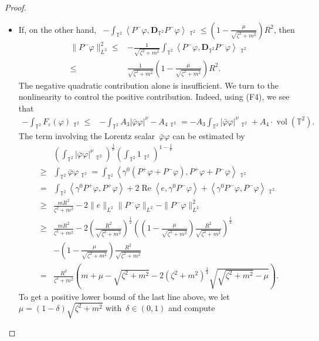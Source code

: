 \documentclass[11pt,final]{amsart}
\newcommand{\T}{\mathbb{T}}
\newcommand{\dd}{\mathop{}\!\mathrm{d}}
\newcommand{\eps}{\varepsilon}
\newcommand{\pD}{\mathbf{D}}
\newcommand{\Abracket}[1]{\left<#1\right>} %
\newcommand{\parenthesis}[1]{\left(#1\right)} %
\DeclareMathOperator{\dv}{\dd{vol}}
\DeclareMathOperator{\vol}{vol}
\begin{document}
\begin{proof}
\begin{itemize}
    \item If, on the other hand, ~$-\int_{\T^2}\Abracket{P^-\varphi,\pD_{\T^2} P^-\varphi}\dv_{\T^2}\leq(1-\frac{\mu}{\sqrt{\zeta^2+m^2}})R^2$, then 
    \begin{align}
    \|P^-\varphi\|_{L^2}^2
    \leq& -\frac{1}{\sqrt{\zeta^2+m^2}} \int_{\T^2} \Abracket{P^-\varphi,\pD_{\T^2} P^-\varphi }\dv_{\T^2} \\
    \leq& \frac{1}{\sqrt{\zeta^2+m^2}}(1-\frac{\mu}{\sqrt{\zeta^2+m^2}})R^2.
    \end{align}
    The negative quadratic contribution alone is insufficient.
    We turn to the nonlinearity to control the positive contribution.
    Indeed, using (F4), we see that
    \begin{align}
    -\int_{\T^2} F_\eps(\varphi)\dv_{\T^2}
    \leq& -\int_{\T^2} A_3 |\bar{\varphi}\varphi|^\nu -A_4 \dv_{\T^2}
    =-A_3\int_{\T^2} |\bar{\varphi}\varphi|^\nu\dv_{\T^2} + A_4 \cdot\vol(\T^2).
    \end{align}
    The term involving the Lorentz scalar~$\bar{\varphi}\varphi$ can be estimated by
    \begin{align}
    &\parenthesis{\int_{\T^2} |\bar{\varphi}\varphi|^\nu\dv_{\T^2} }^{\frac{1}{\nu}}
    \parenthesis{\int_{\T^2} 1 \dv_{\T^2}}^{1-\frac{1}{\nu}}\\
    \geq&  \int_{\T^2} \bar{\varphi}\varphi\dv_{\T^2}
    = \int_{\T^2} \Abracket{\gamma^0\parenthesis{P^+\varphi+ P^-\varphi}, P^+\varphi + P^-\varphi}\dv_{\T^2} \\
    =& \int_{\T^2} \Abracket{\gamma^0 P^+ \varphi, P^+\varphi} + 2\operatorname{Re}\Abracket{ e,\gamma^0P^-\varphi}
    + \Abracket{\gamma^0 P^- \varphi, P^-\varphi}\dv_{\T^2} \\
    \geq & \frac{mR^2}{{\zeta^2+m^2}} -2\|e\|_{L^2}\|P^-\varphi\|_{L^2}-\|P^-\varphi\|_{L^2}^2\\
    \geq&\frac{mR^2}{{\zeta^2+m^2}}-2\parenthesis{\frac{R^2}{\sqrt{\zeta^2+m^2}} }^{\frac{1}{2}}\parenthesis{ \parenthesis{1-\frac{\mu}{\sqrt{\zeta^2+m^2}}}\frac{R^2}{\sqrt{\zeta^2+m^2}}  }^{\frac{1}{2}}  \\
        & -\parenthesis{1-\frac{\mu}{\sqrt{\zeta^2+m^2}}}\frac{R^2}{\sqrt{\zeta^2+m^2}} \\
    =&\frac{R^2}{{\zeta^2+m^2}} \parenthesis{m+\mu-\sqrt{\zeta^2+m^2} -2(\zeta^2+m^2)^{\frac{1}{4}}\sqrt{\sqrt{ \zeta^2+m^2 }  -\mu} }.
\end{align}
To get a positive lower bound of the last line above, we let~$\mu=(1-\delta)\sqrt{\zeta^2+m^2}$ with~$\delta\in(0,1)$ and compute

\end{itemize}
\end{proof}
\end{document}
